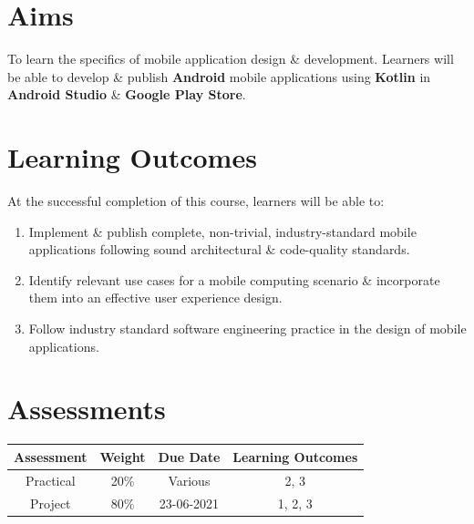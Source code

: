 \documentclass{article}
\begin{document}
\section*{Aims}
To learn the specifics of mobile application design \& development. Learners will be able to develop \& publish \textbf{Android} mobile applications using \textbf{Kotlin} in \textbf{Android Studio} \& \textbf{Google Play Store}.

\section*{Learning Outcomes}
At the successful completion of this course, learners will be able to: 
\begin{enumerate}
	\item Implement \& publish complete, non-trivial, industry-standard mobile applications following sound architectural \& code-quality standards.
	\item Identify relevant use cases for a mobile computing scenario \& incorporate them into an effective user experience design.
	\item Follow industry standard software engineering practice in the design of mobile applications.
\end{enumerate} 

\section*{Assessments}
\renewcommand{\arraystretch}{1.5}	
\begin{tabular}{|c|c|c|c|}
	\hline
	\textbf{Assessment} & \textbf{Weight} & \textbf{Due Date} & \textbf{Learning Outcomes} \\ \hline
	Practical           & 20\%            & Various           & 2, 3                       \\ \hline
	Project             & 80\%            & 23-06-2021        & 1, 2, 3                    \\ \hline
\end{tabular} 
\end{document}
